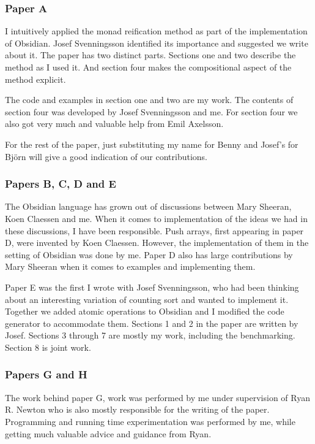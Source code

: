 \documentclass[a4paper]{book}
\begin{document}
\subsubsection{Paper A}
I intuitively applied the monad reification method as part of the implementation 
of Obsidian. Josef Svenningsson identified its importance and suggested we write 
about it. The paper has two distinct parts. Sections one and two describe the 
method as I used it. And section four makes the compositional aspect of the method 
explicit. 

The code and examples in section one and two are my work. The contents of section four was 
developed by Josef Svenningsson and me. For section four we also got very much and valuable help 
from Emil Axelsson. 

For the rest of the paper, just substituting my name for Benny and Josef's for Bj\"orn
will give a good indication of our contributions. 

\subsubsection{Papers B, C, D and E} 
The Obsidian language has grown out of discussions between Mary Sheeran, Koen Claessen and me. 
When it comes to implementation of the ideas we had in these discussions, I have been responsible. 
Push arrays, first appearing in paper D, were invented by Koen Claessen. However, the 
implementation of them in the setting of Obsidian was done by me. Paper D also has large 
contributions by Mary Sheeran when it comes to examples and implementing them. 

Paper E was the first I wrote with Josef Svenningsson, who had been thinking about an interesting
variation of counting sort and wanted to implement it. Together we added atomic operations to 
Obsidian and I modified the code generator to accommodate them. Sections 
1 and 2 in the paper are written by Josef. Sections 3 through 7 are mostly my work, including 
the benchmarking. Section 8 is joint work.

\subsubsection{Papers G and H} 
The work behind paper G, work was performed by me 
under supervision of Ryan R. Newton who is also mostly responsible for the writing of the 
paper. Programming and running time experimentation was performed by me, while getting much 
valuable advice and guidance from Ryan. 
\end{document}
